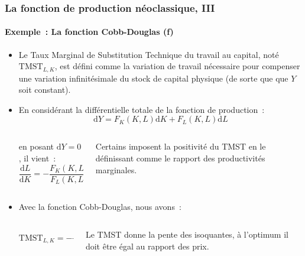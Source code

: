\documentclass[10pt,notheorems]{beamer}
\theoremstyle{plain}
\theoremstyle{definition} %
\begin{document}
\begin{frame}
  \frametitle{La fonction de production néoclassique, III}
  \framesubtitle{Exemple~: La fonction Cobb-Douglas (f)}

  \medskip

  \begin{itemize}

  \item Le Taux Marginal de Substitution Technique du travail au capital, noté $\textrm{TMST}_{L,K}$, est défini comme la variation de travail nécessaire pour compenser une variation infinitésimale du stock de capital physique (de sorte que que $Y$ soit constant).\newline

  \item En considérant la différentielle totale de la fonction de production~:
    \[
      \mathrm dY = F_K(K,L)\mathrm dK + F_L(K,L)\mathrm dL
    \]
    \begin{columns}
      \begin{column}{0.7\textwidth}
        \begin{addmargin}[1,1cm]{0cm}
          en posant $\mathrm dY = 0$, il vient~:
          \[
            \frac{\mathrm d L}{\mathrm d K} = -\frac{F_K(K,L)}{F_L(K,L)} \equiv \textrm{TMST}_{L,K}
          \]
        \end{addmargin}
      \end{column}
      \begin{column}{0.3\textwidth}
        {\tiny Certains imposent la positivité du TMST en le définissant comme le rapport des productivités marginales.}
      \end{column}
    \end{columns}
    \bigskip
  \item Avec la fonction Cobb-Douglas, nous avons~:
    \begin{columns}
      \begin{column}{0.7\textwidth}
        \begin{addmargin}[1,1cm]{0cm}
          \[
            \textrm{TMST}_{L,K} = -\frac{\alpha}{1-\alpha}\frac{L}{K}
          \]
        \end{addmargin}
      \end{column}
      \begin{column}{0.3\textwidth}
        {\tiny Le TMST donne la pente des isoquantes, à l'optimum il doit être égal au rapport des prix.}
      \end{column}
    \end{columns}
  \end{itemize}
\end{frame}
\end{document}
